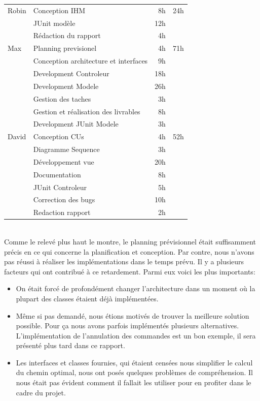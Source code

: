 \documentclass[10pt,a4paper]{book}
\begin{document}
\begin{longtable}{|l|l|r|l|}
\hline
Robin & Conception IHM & 8h & 24h\\
\cline{2-3}
& JUnit modèle & 12h & ~\\
\cline{2-3}
& Rédaction du rapport & 4h & ~\\
\hline

\hline
Max & Planning previsionel & 4h & 71h\\
\cline{2-3}
& Conception architecture et interfaces & 9h & ~\\
\cline{2-3}
& Development Controleur & 18h & ~\\
\cline{2-3}
& Development Modele & 26h & ~\\
\cline{2-3}
& Gestion des taches & 3h & ~\\
\cline{2-3}
& Gestion et réalisation des livrables & 8h & ~\\
\cline{2-3}
& Development JUnit Modele & 3h & ~\\
\hline

\hline
David & Conception CUs & 4h & 52h\\
\cline{2-3}
& Diagramme Sequence & 3h & ~\\
\cline{2-3}
& Développement vue & 20h & ~\\
\cline{2-3}
& Documentation & 8h & ~\\
\cline{2-3}
& JUnit Controleur & 5h & ~\\
\cline{2-3}
& Correction des bugs & 10h & ~\\
\cline{2-3}
& Redaction rapport & 2h & ~\\
\hline
\end{longtable}
~\\Comme le relevé plus haut le montre, le planning prévisionnel était suffisamment précis en ce qui concerne la planification et conception. Par contre, nous n'avons pas réussi à réaliser les implémentations dans le temps prévu. Il y a plusieurs facteurs qui ont contribué à ce retardement. Parmi eux voici les plus importants:
\begin{itemize}
	\item{On était forcé de profondément changer l'architecture dans un moment où la plupart des classes étaient déjà implémentées.}
	\item{Même si pas demandé, nous étions motivés de trouver la meilleure solution possible. Pour ça nous avons parfois implémentés plusieurs alternatives. L'implémentation de l'annulation des commandes est un bon exemple, il sera présenté plus tard dans ce rapport.}
	\item{Les interfaces et classes fournies, qui étaient censées nous simplifier le calcul du chemin optimal, nous ont posés quelques problèmes de compréhension. Il nous était pas évident comment il fallait les utiliser pour en profiter dans le cadre du projet.}
\end{itemize}
\end{document}
